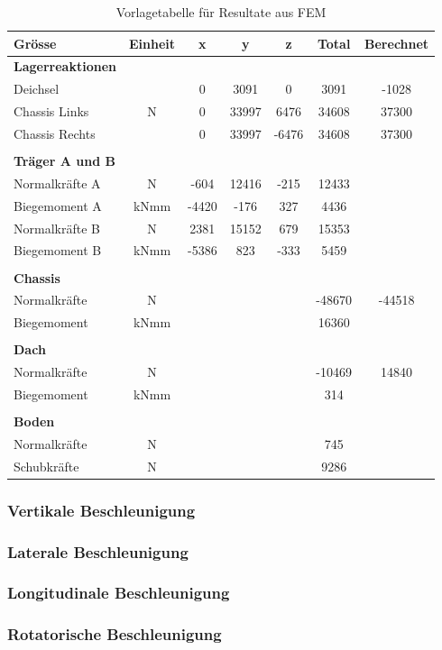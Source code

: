 \begin{table}[h!]
\centering
\begin{tabular}{lcccccc}
Grösse	&	Einheit	&	x	&	y	&	z	&	Total	&	Berechnet	\\	\hline
\textbf{Lagerreaktionen}	&		&		&		&		&		&		\\	\thickhline
Deichsel	&		&	0	&	3091	&	0	&	3091	&	-1028	\\
Chassis Links	&	N	&	0	&	33997	&	6476	&	34608	&	37300	\\
Chassis Rechts	&		&	0	&	33997	&	-6476	&	34608	&	37300	\\	\hline	\\
\textbf{Träger A und B}	&		&		&		&		&		&		\\	\thickhline
Normalkräfte A	&	N	&	-604	&	12416	&	-215	&	12433	&		\\
Biegemoment A	&	kNmm	&	-4420	&	-176	&	327	&	4436	&		\\
Normalkräfte B	&	N	&	2381	&	15152	&	679	&	15353	&		\\
Biegemoment B	&	kNmm	&	-5386	&	823	&	-333	&	5459	&		\\	\hline	\\
\textbf{Chassis}	&		&		&		&		&		&		\\	\thickhline
Normalkräfte	&	N	&		&		&		&	-48670	&	-44518	\\
Biegemoment	&	kNmm	&		&		&		&	16360	&		\\	\hline	\\
\textbf{Dach}	&		&		&		&		&		&		\\	\thickhline
Normalkräfte	&	N	&		&		&		&	-10469	&	14840	\\
Biegemoment	&	kNmm	&		&		&		&	314	&		\\	\hline	\\
\textbf{Boden}	&		&		&		&		&		&		\\	\thickhline
Normalkräfte	&	N	&		&		&		&	745	&		\\
Schubkräfte	&	N	&		&		&		&	9286	&		\\	\hline
\end{tabular}
\caption{Vorlagetabelle für Resultate aus FEM}%
\label{Resultate Vorlage}
\end{table}







\subsubsection*{Vertikale Beschleunigung}


\subsubsection*{Laterale Beschleunigung}


\subsubsection*{Longitudinale Beschleunigung}


\subsubsection*{Rotatorische Beschleunigung}


\newpage
